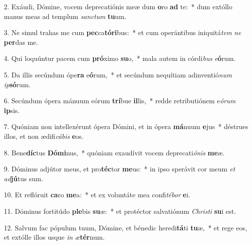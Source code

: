 2. Exáudi, Dómine, vocem deprecatiónis meæ dum \textbf{o}ro \textbf{ad} te:~*  dum extóllo manus meas ad templum \textit{sanc}\textit{tum} \textbf{tu}um.\

3. Ne simul trahas me cum \textbf{pec}ca\textbf{tó}\textbf{ri}bus:~*  et cum operántibus iniquitá\textit{tem} \textit{ne} \textbf{per}das me.\

4. Qui loquúntur pacem cum \textbf{pró}ximo \textbf{su}o,~*  mala autem in córdi\textit{bus} \textit{e}\textbf{ó}rum.\

5. Da illis secúndum ópe\textbf{ra} e\textbf{ó}rum,~*  et secúndum nequítiam adinventió\textit{num} \textit{ip}\textbf{só}rum.\

6. Secúndum ópera mánuum eórum \textbf{trí}bue \textbf{il}lis,~*  redde retributiónem e\textit{ó}\textit{rum} \textbf{ip}sis.\

7. Quóniam non intellexérunt ópera Dómini, et in ópera \textbf{má}nuum \textbf{e}jus~*  déstrues illos, et non ædifi\textit{cá}\textit{bis} \textbf{e}os.\

8. Bene\textbf{díc}tus \textbf{Dó}\textbf{mi}nus,~*  quóniam exaudívit vocem deprecati\textit{ó}\textit{nis} \textbf{me}æ.\

9. Dóminus adjútor meus, et pro\textbf{téc}tor \textbf{me}us:~*  in ipso sperávit cor meum \textit{et} \textit{ad}\textbf{jú}tus sum.\

10. Et reflóruit \textbf{ca}ro \textbf{me}a:~*  et ex voluntáte mea confi\textit{té}\textit{bor} \textbf{e}i.\

11. Dóminus fortitúdo \textbf{ple}bis \textbf{su}æ:~*  et protéctor salvatiónum \textit{Chris}\textit{ti} \textbf{su}i est.\

12. Salvum fac pópulum tuum, Dómine, et bénedic heredi\textbf{tá}ti \textbf{tu}æ,~*  et rege eos, et extólle illos usque \textit{in} \textit{æ}\textbf{tér}num.\

